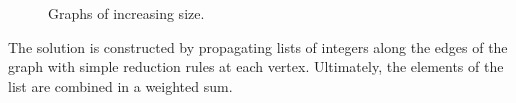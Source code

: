 \documentclass{article}
\begin{document}
\begin{figure}
  \centering
    \caption{Graphs of increasing size.} \label{fig:sgrhs}
\end{figure}


The solution is constructed by propagating lists of integers along the edges of the graph with simple reduction rules at each vertex.  Ultimately, the elements of the list are combined in a weighted sum.
\end{document}
